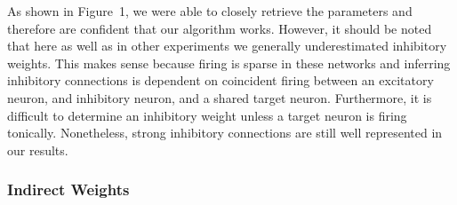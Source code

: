 \documentclass{article}
\begin{document}
As shown in Figure~1, we were able to closely retrieve the parameters and therefore are confident that our algorithm works. However, it should be noted that here as well as in other experiments we generally underestimated inhibitory weights. This makes sense because firing is sparse in these networks and inferring inhibitory connections is dependent on coincident firing between an excitatory neuron, and inhibitory neuron, and a shared target neuron. Furthermore, it is difficult to determine an inhibitory weight unless a target neuron is firing tonically. Nonetheless, strong inhibitory connections are still well represented in our results.

\subsubsection{Indirect Weights}
\end{document}
